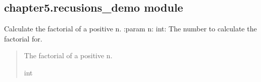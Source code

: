\documentclass[letterpaper,10pt,english]{sphinxmanual}
\begin{document}
\begin{fulllineitems}
\label{\detokenize{chapter5:chapter5.rec_search.main}}
\pysigstartsignatures
{}
\pysigstopsignatures
\end{fulllineitems}


\begin{fulllineitems}
\label{\detokenize{chapter5:chapter5.rec_search.search_file}}
\pysigstartsignatures
{}
\pysigstopsignatures
\end{fulllineitems}



\subsection{chapter5.recusions\_demo module}
\label{\detokenize{chapter5:module-chapter5.recusions_demo}}\label{\detokenize{chapter5:chapter5-recusions-demo-module}}

\begin{fulllineitems}
\label{\detokenize{chapter5:chapter5.recusions_demo.even_nbr}}
\pysigstartsignatures
{}
\pysigstopsignatures
\end{fulllineitems}


\begin{fulllineitems}
\label{\detokenize{chapter5:chapter5.recusions_demo.fac3}}
\pysigstartsignatures
{}
\pysigstopsignatures
\sphinxAtStartPar
Calculate the factorial of a positive n.
:param n: int: The number to calculate the factorial for.
\begin{quote}\begin{description}
\sphinxAtStartPar
The factorial of a positive n.

\sphinxAtStartPar
int

\end{description}\end{quote}

\end{fulllineitems}
\end{document}
